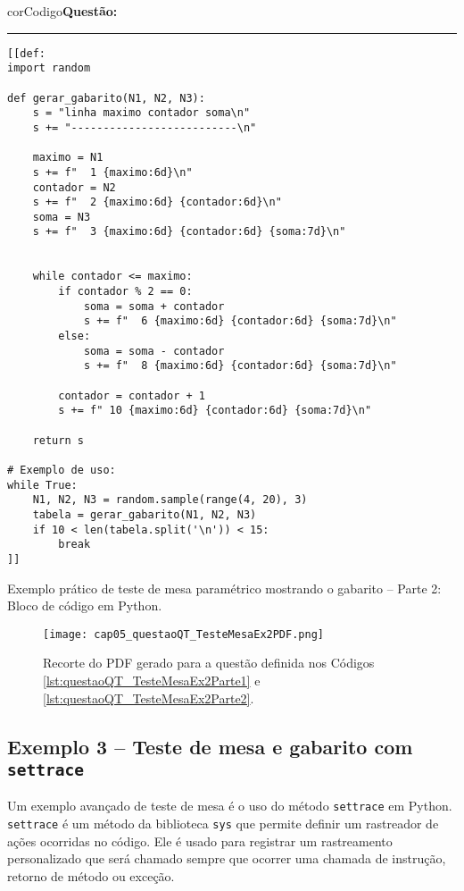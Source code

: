 \begin{listing}[!ht]
\begin{myboxCode}{corCodigo}{\textbf{Questão: }}\vspace{3mm}
\hrule
\begin{verbatim}
[[def:
import random

def gerar_gabarito(N1, N2, N3):
    s = "linha maximo contador soma\n"
    s += "--------------------------\n"
    
    maximo = N1
    s += f"  1 {maximo:6d}\n"
    contador = N2
    s += f"  2 {maximo:6d} {contador:6d}\n"
    soma = N3
    s += f"  3 {maximo:6d} {contador:6d} {soma:7d}\n"


    while contador <= maximo:
        if contador % 2 == 0:
            soma = soma + contador
            s += f"  6 {maximo:6d} {contador:6d} {soma:7d}\n"
        else:
            soma = soma - contador
            s += f"  8 {maximo:6d} {contador:6d} {soma:7d}\n"

        contador = contador + 1
        s += f" 10 {maximo:6d} {contador:6d} {soma:7d}\n"
    
    return s

# Exemplo de uso:
while True:
    N1, N2, N3 = random.sample(range(4, 20), 3)
    tabela = gerar_gabarito(N1, N2, N3)
    if 10 < len(tabela.split('\n')) < 15:
        break
]]
\end{verbatim}
\end{myboxCode}
\caption{Exemplo prático de teste de mesa paramétrico mostrando o gabarito -- Parte 2: Bloco de código em Python.}
\label{lst:questaoQT_TesteMesaEx2Parte2}
\end{listing}

\begin{figure}[!hb]
  \texttt{[image: cap05\_questaoQT\_TesteMesaEx2PDF.png]}
  \caption{Recorte do PDF gerado para a questão definida nos Códigos \ref{lst:questaoQT_TesteMesaEx2Parte1} e \ref{lst:questaoQT_TesteMesaEx2Parte2}.}
  \label{fig:cap05_questaoQT_TesteMesaEx2PDF}
\end{figure}

\subsection{Exemplo 3 -- Teste de mesa e gabarito com \texttt{settrace}}
 
Um exemplo avançado de teste de mesa é o uso do método \verb|settrace| em Python. \verb|settrace| é um método da biblioteca \verb|sys| que permite definir um rastreador de ações ocorridas no código. Ele é usado para registrar um rastreamento personalizado que será chamado sempre que ocorrer uma chamada de instrução, retorno de método ou exceção.

